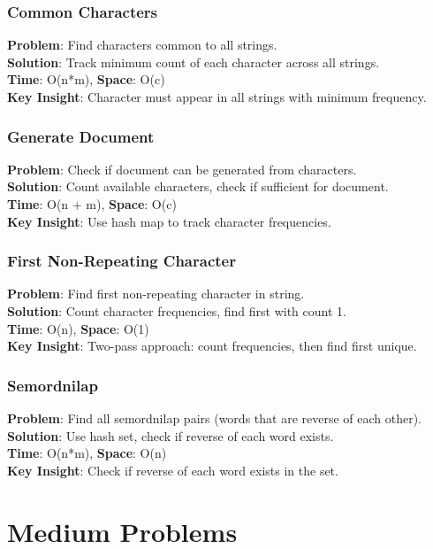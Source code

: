 \documentclass{report}
\begin{document}
\subsection{Common Characters}
\textbf{Problem}: Find characters common to all strings.\\
\textbf{Solution}: Track minimum count of each character across all strings.\\
\textbf{Time}: O(n*m), \textbf{Space}: O(c)\\
\textbf{Key Insight}: Character must appear in all strings with minimum frequency.

\subsection{Generate Document}
\textbf{Problem}: Check if document can be generated from characters.\\
\textbf{Solution}: Count available characters, check if sufficient for document.\\
\textbf{Time}: O(n + m), \textbf{Space}: O(c)\\
\textbf{Key Insight}: Use hash map to track character frequencies.

\subsection{First Non-Repeating Character}
\textbf{Problem}: Find first non-repeating character in string.\\
\textbf{Solution}: Count character frequencies, find first with count 1.\\
\textbf{Time}: O(n), \textbf{Space}: O(1)\\
\textbf{Key Insight}: Two-pass approach: count frequencies, then find first unique.

\subsection{Semordnilap}
\textbf{Problem}: Find all semordnilap pairs (words that are reverse of each other).\\
\textbf{Solution}: Use hash set, check if reverse of each word exists.\\
\textbf{Time}: O(n*m), \textbf{Space}: O(n)\\
\textbf{Key Insight}: Check if reverse of each word exists in the set.

\chapter{Medium Problems}
\end{document}
